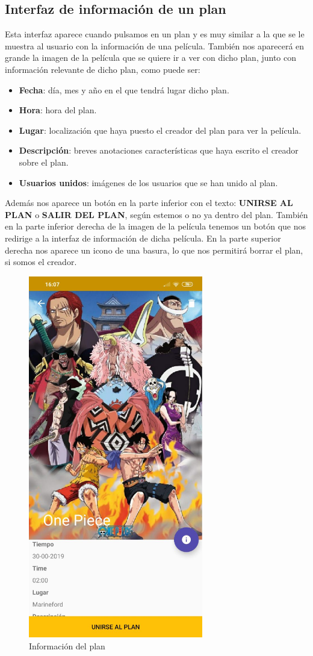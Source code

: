 \subsection{Interfaz de información de un plan}
\label{makereference3.4.9}
Esta interfaz aparece cuando pulsamos en un plan y es muy similar a la que se le muestra al usuario con la información
de una película. También nos aparecerá en grande la imagen de la película que se quiere ir a ver con dicho plan, junto con información
relevante de dicho plan, como puede ser:
\begin{itemize}
    \item \textbf{Fecha}: día, mes y año en el que tendrá lugar dicho plan.
    \item \textbf{Hora}: hora del plan.
    \item \textbf{Lugar}: localización que haya puesto el creador del plan para ver la película.
    \item \textbf{Descripción}: breves anotaciones características que haya escrito el creador sobre el plan.
    \item \textbf{Usuarios unidos}: imágenes de los usuarios que se han unido al plan.
\end{itemize}
Además nos aparece un botón en la parte inferior con el texto: \textbf{UNIRSE AL PLAN} o \textbf{SALIR DEL PLAN}, según estemos o no ya dentro del plan.
También en la parte inferior derecha de la imagen de la película tenemos un botón que nos redirige a la interfaz de información de dicha película.
En la parte superior derecha nos aparece un icono de una basura, lo que nos permitirá borrar el plan, si somos el creador.
\begin{figure}[H]
    \centering
    \includegraphics[width=3in]{figures/infoPlan1.jpg}
    \caption{Información del plan}
\end{figure}
